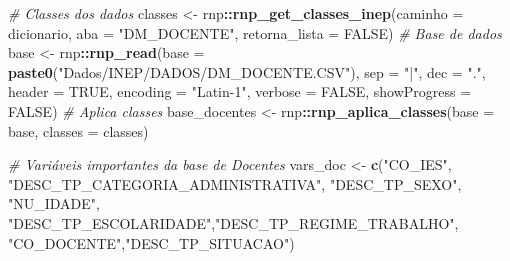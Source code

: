 \documentclass[12pt,]{style/krantz}
\makeatletter
\newenvironment{Shaded}{\begin{snugshade}}{\end{snugshade}}
\newcommand{\CommentTok}[1]{\textcolor[rgb]{0.56,0.35,0.01}{\textit{#1}}}
\newcommand{\DataTypeTok}[1]{\textcolor[rgb]{0.13,0.29,0.53}{#1}}
\newcommand{\KeywordTok}[1]{\textcolor[rgb]{0.13,0.29,0.53}{\textbf{#1}}}
\newcommand{\NormalTok}[1]{#1}
\newcommand{\OperatorTok}[1]{\textcolor[rgb]{0.81,0.36,0.00}{\textbf{#1}}}
\newcommand{\OtherTok}[1]{\textcolor[rgb]{0.56,0.35,0.01}{#1}}
\newcommand{\StringTok}[1]{\textcolor[rgb]{0.31,0.60,0.02}{#1}}
\newenvironment{kframe}{%
\medskip{}
\setlength{\fboxsep}{.8em}
 \def\at@end@of@kframe{}%
 \ifinner\ifhmode%
  \def\at@end@of@kframe{\end{minipage}}%
  \begin{minipage}{\columnwidth}%
 \fi\fi%
 \def\FrameCommand##1{\hskip\@totalleftmargin \hskip-\fboxsep
 \colorbox{shadecolor}{##1}\hskip-\fboxsep
     \hskip-\linewidth \hskip-\@totalleftmargin \hskip\columnwidth}%
 \MakeFramed {\advance\hsize-\width
   \@totalleftmargin\z@ \linewidth\hsize
   \@setminipage}}%
 {\par\unskip\endMakeFramed%
 \at@end@of@kframe}
\renewenvironment{Shaded}{\begin{kframe}}{\end{kframe}}
\theoremstyle{definition}
\theoremstyle{definition}
\theoremstyle{definition}
\theoremstyle{remark}
\makeatother
\begin{document}
\begin{Shaded}
\begin{Highlighting}[]
\CommentTok{# Classes dos dados}
\NormalTok{classes <-}\StringTok{ }\NormalTok{rnp}\OperatorTok{::}\KeywordTok{rnp_get_classes_inep}\NormalTok{(}\DataTypeTok{caminho =}\NormalTok{ dicionario, }
                                \DataTypeTok{aba =} \StringTok{"DM_DOCENTE"}\NormalTok{, }
                                \DataTypeTok{retorna_lista =} \OtherTok{FALSE}\NormalTok{)}
\CommentTok{# Base de dados  }
\NormalTok{base <-}\StringTok{ }\NormalTok{rnp}\OperatorTok{::}\KeywordTok{rnp_read}\NormalTok{(}\DataTypeTok{base =} \KeywordTok{paste0}\NormalTok{(}\StringTok{"Dados/INEP/DADOS/DM_DOCENTE.CSV"}\NormalTok{),}
                      \DataTypeTok{sep =} \StringTok{"|"}\NormalTok{, }
                      \DataTypeTok{dec =} \StringTok{"."}\NormalTok{, }
                      \DataTypeTok{header =} \OtherTok{TRUE}\NormalTok{, }
                      \DataTypeTok{encoding =} \StringTok{"Latin-1"}\NormalTok{,}
                      \DataTypeTok{verbose =} \OtherTok{FALSE}\NormalTok{, }
                      \DataTypeTok{showProgress =} \OtherTok{FALSE}\NormalTok{)}
\CommentTok{# Aplica classes}
\NormalTok{base_docentes <-}\StringTok{ }\NormalTok{rnp}\OperatorTok{::}\KeywordTok{rnp_aplica_classes}\NormalTok{(}\DataTypeTok{base =}\NormalTok{ base, }
                                         \DataTypeTok{classes =}\NormalTok{ classes)}

\CommentTok{# Variáveis importantes da base de Docentes}
\NormalTok{vars_doc <-}\StringTok{ }\KeywordTok{c}\NormalTok{(}\StringTok{"CO_IES"}\NormalTok{, }\StringTok{"DESC_TP_CATEGORIA_ADMINISTRATIVA"}\NormalTok{, }\StringTok{"DESC_TP_SEXO"}\NormalTok{,}
              \StringTok{"NU_IDADE"}\NormalTok{, }\StringTok{"DESC_TP_ESCOLARIDADE"}\NormalTok{,}\StringTok{"DESC_TP_REGIME_TRABALHO"}\NormalTok{,}
              \StringTok{"CO_DOCENTE"}\NormalTok{,}\StringTok{"DESC_TP_SITUACAO"}\NormalTok{)}


\end{Highlighting}
\end{Shaded}
\end{document}
